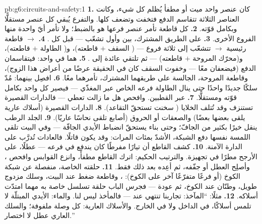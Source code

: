 \begin{solution}{pb:g6:circuits-and-safety:1}
\textbf{1.}  كان عنصر واحد ميت أو مطفأ يُظلم كل
شيء، وكانت العناصر الثلاثة تتقاسم الدفع فتخفت وتضعف كلها.
والتفرع يُبقي كل عنصر مستقلًّا وبكامل قوّته.
\textbf{2.} كل قاطعة تأمر عنصر فرعها هو بالضبط؛ ولا تأمر أيّ
واحدة منها الفروع الأخرى.
\textbf{3.} على الطريق المشترك، بين  وأول تشعّب ---
قبل كل .
\textbf{4.}  $\to$ قاطعة رئيسية $\to$  تتشعّب إلى
ثلاثة فروع --- ( السقف $+$ قاطعته)، و( الطاولة $+$
قاطعته)، و(محرّك المروحة $+$ قاطعته) --- ثم تلتقي عائدة إلى
.
\textbf{5.} هما  في  واحد: فيتقاسمان الدفع
(فيضعفان معًا --- وخفوت  السقف كان في الحقيقة عرضًا من
أعراض هذا الزوج)، وقاطعة المروحة، الجالسة على طريقهما المشترك،
تأمرهما معًا.
\textbf{6.} افصِل بينهما: مُدّ سلكًا جديدًا واحدًا حتى ينال
 الطاولة فرعه الخاص عبر المغذّي --- فيصير كل واحد بكامل
قوّته ومستقلًّا.
\textbf{7.}  عبر القطبين. وافحص هل ما زالت 
تعطي --- فالدارات القصيرة تستنزف وقد تُتلف الخلايا (
سخنت تستحقّ التقاعد).
\textbf{8.} الدارات القصيرة (أسلاك عارية يلقى بعضها بعضًا)
والصعقات أو الحروق (أصابع تلقى نحاسًا عاريًا).
\textbf{9.} الجلد الرطب ينقل خيرًا بكثير من الجافّ؛ وحتى بناء
 يستحقّ انضباط الأيدي الجافّة --- وفي البيت تلقى
اللمسة نفسها دفع الشبكة، الأشدّ بمئات المرات: وقد يكون قاتلًا.
فالعادات تُدرَّب على الدارة الآمنة.
\textbf{10.} كشف القاطع أن تيارًا مفرطًا كان يندفع في فرعه ---
عطلًا، على الأرجح مطرًا في تجهيزة. والترتيب الحكيم: اترك
القاطع مطفأً، وانزع القوابس وافحص ، وأصلِح العطل أو جفّفه،
ثم أعِده بعد ذلك فقط.
\textbf{11.} حلقته الخاصة، منفصلة عن شبكة الكوخ (أو فرعًا
متفرّعًا آخر على  الكوخ): ، وقاطعة ضغط عند البيت،
وسلك مزدوج طويل، وطنّان عند الكوخ، ثم عودة --- فجرس الباب حلقة
تسلسل خاصة به مهما امتدّت أسلاكه.
\textbf{12.} مثلًا: ``المآخذ: تجاربنا تنتهي عند  ---
فالمأخذ ليس لنا. والماء: الأيدي المبتلّة لا تلمس أسلاكًا، في
الداخل ولا في الخارج. والأسلاك العارية: كل وصلة ملفوفة؛ والسلك
العاري عطل لا اختصار.''
\end{solution}
